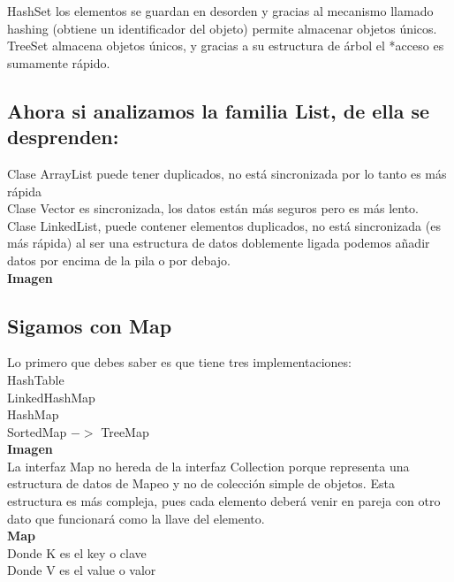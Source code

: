 \documentclass{article}
\begin{document}
HashSet los elementos se guardan en desorden y gracias al mecanismo llamado
hashing (obtiene un identificador del objeto) permite almacenar objetos únicos.\\

TreeSet almacena objetos únicos, y gracias a su estructura de árbol el *acceso
es sumamente rápido.\\

\subsection*{Ahora si analizamos la familia List, de ella se desprenden:}%
Clase ArrayList puede tener duplicados, no está sincronizada por lo tanto es
más rápida\\
Clase Vector es sincronizada, los datos están más seguros pero es más lento.\\
Clase LinkedList, puede contener elementos duplicados, no está sincronizada (es
más rápida) al ser una estructura de datos doblemente ligada podemos añadir
datos por encima de la pila o por debajo.\\



\textbf{Imagen}\\



\subsection*{Sigamos con Map}%
Lo primero que debes saber es que tiene tres implementaciones:\\

HashTable\\
LinkedHashMap\\
HashMap\\
SortedMap $->$ TreeMap\\



\textbf{Imagen}\\



La interfaz Map no hereda de la interfaz Collection porque representa una
estructura de datos de Mapeo y no de colección simple de objetos. Esta
estructura es más compleja, pues cada elemento deberá venir en pareja con otro
dato que funcionará como la llave del elemento.\\


\textbf{Map}\\
Donde K es el key o clave\\
Donde V es el value o valor\\
\end{document}
